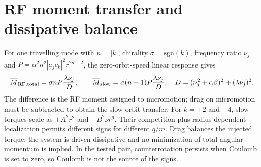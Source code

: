 \section{RF moment transfer and dissipative balance}
For one travelling mode with $n=|k|$, chirality $\sigma=\mathrm{sgn}(k)$, frequency ratio $\nu_j$ and $P=\alpha^2n^2|a_jc_k|^2r^{2n-2}$, the zero-orbit-speed linear response gives
\begin{equation}
\overline M_{\rm RF,total}=\sigma nP\frac{\lambda\nu_j}{D},\qquad
\overline M_{\rm slow}=\sigma(n-1)P\frac{\lambda\nu_j}{D},\quad
D=(\nu_j^2+\alpha\beta)^2+(\lambda\nu_j)^2.
\end{equation}
The difference is the RF moment assigned to micromotion; drag on micromotion must be subtracted to obtain the slow-orbit transfer. For $k=+2$ and $-4$, slow torques scale as $+A^2r^2$ and $-B^2\nu r^6$. Their competition plus radius-dependent localization permits different signs for different $q/m$. Drag balances the injected torque; the system is driven-dissipative and no minimization of total angular momentum is implied. In the tested pair, counterrotation persists when Coulomb is set to zero, so Coulomb is not the source of the signs.
